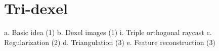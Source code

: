 
\chapter{Tri-dexel}
\label{ch:tri_dexel}

a.	Basic idea (1)
b.	Dexel images (1)
i.	Triple orthogonal raycast
c.	Regularization (2)
d.	Triangulation (3)
e.	Feature reconstruction (3)
